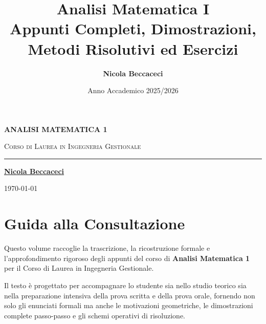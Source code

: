 \documentclass[11pt,a4paper,twoside,openright]{book}
\title{\Huge\textbf{\textsf{Analisi Matematica I}}\\[0.5em]
\Large\textsf{Appunti Completi, Dimostrazioni, Metodi Risolutivi ed Esercizi}}
\author{\textbf{\textsf{Nicola Beccaceci}}}
\date{\textsf{Anno Accademico 2025/2026}}
\begin{document}
\frontmatter
\begin{titlepage}
    \centering
    \vspace*{2cm}
    {\Huge\bfseries\color{navyblue} ANALISI MATEMATICA 1\par}
    \vspace{1cm}
    {\Large\scshape Corso di Laurea in Ingegneria Gestionale\par}
    \vfill
    \rule{0.6\textwidth}{1pt}\par
    \vspace{1cm}
    {\large\textbf{\underline{Nicola Beccaceci}}\par}
    \vspace{0.5cm}
    {\small \today\par}
    \vspace*{2cm}
\end{titlepage}

\tableofcontents
\cleardoublepage

\chapter*{Guida alla Consultazione}
Questo volume raccoglie la trascrizione, la ricostruzione formale e l'approfondimento rigoroso degli appunti del corso di \textbf{Analisi Matematica 1} per il Corso di Laurea in Ingegneria Gestionale.

Il testo è progettato per accompagnare lo studente sia nello studio teorico sia nella preparazione intensiva della prova scritta e della prova orale, fornendo non solo gli enunciati formali ma anche le motivazioni geometriche, le dimostrazioni complete passo-passo e gli schemi operativi di risoluzione.
\end{document}
